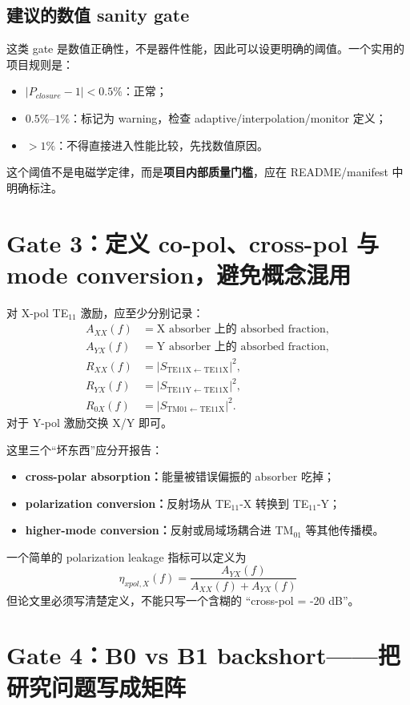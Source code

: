 \documentclass[11pt,a4paper,openany]{ctexrep}
\begin{document}
\subsection*{建议的数值 sanity gate}

这类 gate 是数值正确性，不是器件性能，因此可以设更明确的阈值。一个实用的项目规则是：
\begin{itemize}
  \item $|P_{closure}-1|<0.5\%$：正常；
  \item $0.5\%$--$1\%$：标记为 warning，检查 adaptive/interpolation/monitor 定义；
  \item $>1\%$：不得直接进入性能比较，先找数值原因。
\end{itemize}
这个阈值不是电磁学定律，而是\textbf{项目内部质量门槛}，应在 README/manifest 中明确标注。

\section{Gate 3：定义 co-pol、cross-pol 与 mode conversion，避免概念混用}

对 X-pol TE$_{11}$ 激励，应至少分别记录：
\begin{align*}
A_{XX}(f)&=\text{X absorber 上的 absorbed fraction},\\
A_{YX}(f)&=\text{Y absorber 上的 absorbed fraction},\\
R_{XX}(f)&=|S_{\mathrm{TE11X}\leftarrow\mathrm{TE11X}}|^2,\\
R_{YX}(f)&=|S_{\mathrm{TE11Y}\leftarrow\mathrm{TE11X}}|^2,\\
R_{0X}(f)&=|S_{\mathrm{TM01}\leftarrow\mathrm{TE11X}}|^2.
\end{align*}
对于 Y-pol 激励交换 X/Y 即可。

这里三个“坏东西”应分开报告：
\begin{itemize}
  \item \textbf{cross-polar absorption：}能量被错误偏振的 absorber 吃掉；
  \item \textbf{polarization conversion：}反射场从 TE$_{11}$-X 转换到 TE$_{11}$-Y；
  \item \textbf{higher-mode conversion：}反射或局域场耦合进 TM$_{01}$ 等其他传播模。
\end{itemize}

一个简单的 polarization leakage 指标可以定义为
\[
\boxed{
\eta_{xpol,X}(f)=
\frac{A_{YX}(f)}{A_{XX}(f)+A_{YX}(f)}
}
\]
但论文里必须写清楚定义，不能只写一个含糊的 ``cross-pol = -20 dB''。

\section{Gate 4：B0 vs B1 backshort——把研究问题写成矩阵}
\end{document}
